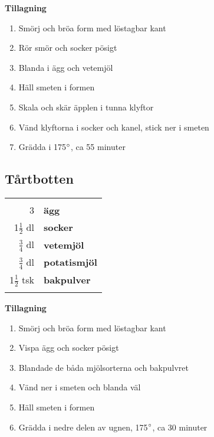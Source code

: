 \begin{multicols*}{2}

\noindent \textbf{Tillagning}
\begin{enumerate}
	\itemsep0cm
	\item Smörj och bröa form med löstagbar kant
	\item Rör smör och socker pösigt
	\item Blanda i ägg och vetemjöl
	\item Häll smeten i formen
	\item Skala och skär äpplen i tunna klyftor
	\item Vänd klyftorna i socker och \mbox{kanel}, stick ner i smeten
	\item Grädda i 175$\degree$, ca 55 minuter
\end{enumerate}

\end{multicols*}

\clearpage

\subsection{Tårtbotten}

\begin{table}[H]
	\begin{tabular}{rl}
	\hline
	&\\
		3 & \textbf{ägg}\\
		1$\frac{1}{2}$ dl & \textbf{socker}\\
		$\frac{3}{4}$ dl & \textbf{vetemjöl}\\
		$\frac{3}{4}$ dl & \textbf{potatismjöl}\\
		1$\frac{1}{2}$ tsk & \textbf{bakpulver}\\
	&\\
	\hline
	\end{tabular}
\end{table}

\begin{multicols*}{2}

\noindent \textbf{Tillagning}
\begin{enumerate}
	\itemsep0cm
	\item Smörj och bröa form med löstagbar kant
	\item Vispa ägg och socker pösigt
	\item Blandade de båda mjölsorterna och bakpulvret
	\item Vänd ner i smeten och blanda väl
	\item Häll smeten i formen
	\item Grädda i nedre delen av ugnen, 175$\degree$, ca 30 minuter
\end{enumerate}

\end{multicols*}

